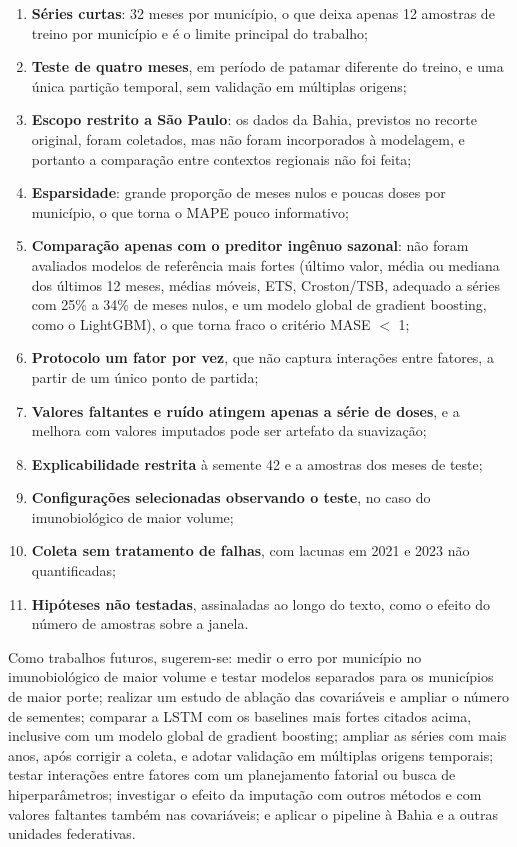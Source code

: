 \documentclass[
    12pt,
    openright,
    oneside,
    a4paper,
    english,
    brazil
]{abntex2}
\begin{document}
\begin{enumerate}
    \item \textbf{Séries curtas}: 32 meses por município, o que deixa apenas 12 amostras de treino por município e é o limite principal do trabalho;
    \item \textbf{Teste de quatro meses}, em período de patamar diferente do treino, e uma única partição temporal, sem validação em múltiplas origens;
    \item \textbf{Escopo restrito a São Paulo}: os dados da Bahia, previstos no recorte original, foram coletados, mas não foram incorporados à modelagem, e portanto a comparação entre contextos regionais não foi feita;
    \item \textbf{Esparsidade}: grande proporção de meses nulos e poucas doses por município, o que torna o MAPE pouco informativo;
    \item \textbf{Comparação apenas com o preditor ingênuo sazonal}: não foram avaliados modelos de referência mais fortes (último valor, média ou mediana dos últimos 12 meses, médias móveis, ETS, Croston/TSB, adequado a séries com 25\% a 34\% de meses nulos, e um modelo global de gradient boosting, como o LightGBM), o que torna fraco o critério MASE $<$ 1;
    \item \textbf{Protocolo um fator por vez}, que não captura interações entre fatores, a partir de um único ponto de partida;
    \item \textbf{Valores faltantes e ruído atingem apenas a série de doses}, e a melhora com valores imputados pode ser artefato da suavização;
    \item \textbf{Explicabilidade restrita} à semente 42 e a amostras dos meses de teste;
    \item \textbf{Configurações selecionadas observando o teste}, no caso do imunobiológico de maior volume;
    \item \textbf{Coleta sem tratamento de falhas}, com lacunas em 2021 e 2023 não quantificadas;
    \item \textbf{Hipóteses não testadas}, assinaladas ao longo do texto, como o efeito do número de amostras sobre a janela.
\end{enumerate}

Como trabalhos futuros, sugerem-se: medir o erro por município no imunobiológico de maior volume e testar modelos separados para os municípios de maior porte; realizar um estudo de ablação das covariáveis e ampliar o número de sementes; comparar a LSTM com os baselines mais fortes citados acima, inclusive com um modelo global de gradient boosting; ampliar as séries com mais anos, após corrigir a coleta, e adotar validação em múltiplas origens temporais; testar interações entre fatores com um planejamento fatorial ou busca de hiperparâmetros; investigar o efeito da imputação com outros métodos e com valores faltantes também nas covariáveis; e aplicar o pipeline à Bahia e a outras unidades federativas.

\postextual


\end{document}
